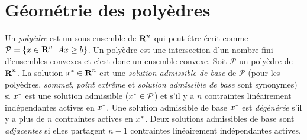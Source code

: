 \section{Géométrie des polyèdres}

Un \emph{polyèdre} est un sous-ensemble de ${\mbox{\bf R}}^n$ qui peut être écrit comme ${\mathcal P}=\{x \in {\mbox{\bf R}}^n |\;  Ax \geq b \}$. Un polyèdre est une
intersection d'un nombre fini d'ensembles convexes et c'est donc un ensemble convexe. Soit
$\mathcal P$ un poly\`edre de
${\mbox{\bf R}}^n$. La solution
$x^*
\in {\mbox{\bf R}}^n$ est une
\emph{solution admissible de base}  de
$\mathcal P$ (pour les poly\`edres, \emph{sommet}, \emph{point extrême} et \emph{solution admissible de base} sont synonymes)
si  $x^*$ est une solution admissible ($x^*
\in {\mathcal{P}}$) et s'il y a
$n$ contraintes linéairement indépendantes actives en
$x^*$. Une solution admissible de base $x^*$ est \emph{dégénérée}     s'il y a plus de $n$ contraintes actives en
$x^*$. Deux solutions admissibles de base sont \emph{adjacentes}   si elles partagent $n-1$ contraintes linéairement indépendantes
actives.\\


\newpage



